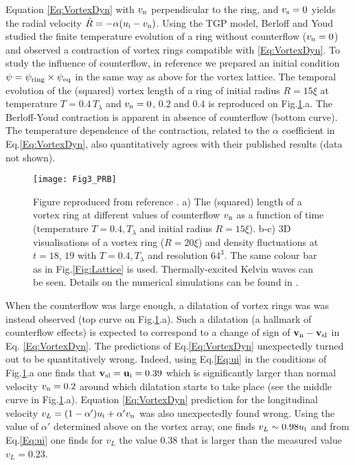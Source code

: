 \documentclass[sn-mathphys]{sn-jnl}%
\begin{document}
Equation \eqref{Eq:VortexDyn} with $v_{\rm n}$ perpendicular to the ring, and $v_{\rm s}=0$ yields the radial velocity $\dot{R}=-\alpha(u_{\rm i}-v_{\rm n})$. 
Using the TGP model, Berloff and Youd \cite{Berloff07} studied the finite temperature evolution of a ring without counterflow ($v_{\rm n}=0$) and observed a contraction of vortex rings compatible with \eqref{Eq:VortexDyn}. To study the influence of counterflow, in reference \cite{Krstulovic11b} we prepared an initial condition $\psi=\psi_{\rm ring}\times\psi_{\rm eq}$ in the same way as above for the vortex lattice. The temporal evolution of the (squared) vortex length of a ring of initial radius $R=15\xi$ at temperature $T=0.4\,T_{\lambda}$ and $v_{\rm n}=0$, $0.2$ and $0.4$ is reproduced on Fig.\ref{Fig:3}.a. 
%
The Berloff-Youd contraction \cite{Berloff07} is apparent in absence of counterflow (bottom curve). The temperature dependence of the contraction, related to the $\alpha$ coefficient in Eq.\eqref{Eq:VortexDyn}, also quantitatively agrees with their published results (data not shown).
\begin{figure}[htbp]
\begin{center}
\texttt{[image: Fig3\_PRB]}
\caption{Figure reproduced from reference \cite{Krstulovic11b}. a) The (squared) length of a vortex ring at different values of counterflow $v_{\rm n}$ as a function of time (temperature $T=0.4,T_{\lambda}$ and initial radius $R=15\xi$). b-c) $3$D visualisations of a vortex ring ($R=20\xi$) and density fluctuations at $t=18$, $19$ with $T=0.4,T_{\lambda}$ and resolution $64^3$. The same colour bar as in Fig.\ref{Fig:Lattice} is used. Thermally-excited Kelvin waves can be seen. {Details on the numerical simulations can be found in \cite{Krstulovic11b}.}}
\label{Fig:3}
\end{center}
\end{figure}

When the counterflow was large enough, a dilatation of vortex rings was was instead observed (top curve on Fig.\ref{Fig:3}.a).
%
Such a dilatation (a hallmark of counterflow effects) is expected \cite{Donnelly} to correspond to a change of sign of ${\bf v}_{\rm n}-{\bf v}_{\rm sl}$ in Eq. \eqref{Eq:VortexDyn}. 
%
The predictions of Eq.\eqref{Eq:VortexDyn} unexpectedly turned out to be quantitatively wrong. Indeed, using Eq.\eqref{Eq:ui} in the conditions of Fig.\ref{Fig:3}.a one finds that ${\bf v}_{\rm sl}={\bf u}_{\rm i}=0.39$
which is significantly larger than normal velocity $v_{\rm n}=0.2$ around which
dilatation starts to take place (see the middle curve in Fig.\ref{Fig:3}.a).
%
Equation \eqref{Eq:VortexDyn} prediction for the longitudinal velocity $v_{L}=(1-\alpha')u_{\rm i}+\alpha'v_{\rm n}$ was also unexpectedly found wrong. 
Using the value of $\alpha'$ determined above on the vortex array, one finds $v_{L}\sim 0.98 u_{\rm i}$ and from Eq.\eqref{Eq:ui} one finds for $v_{L}$ the value $0.38$ that is larger than the measured value $v_L=0.23$.
\end{document}
